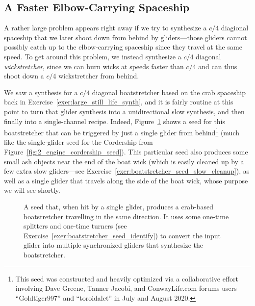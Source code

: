 \subsection{A Faster Elbow-Carrying Spaceship}\label{sec:fast_demonoid_elbow_carry}

A rather large problem appears right away if we try to synthesize a $c/4$ diagional spaceship that we later shoot down from behind by gliders---those gliders cannot possibly catch up to the elbow-carrying spaceship since they travel at the same speed. To get around this problem, we instead synthesize a $c/4$ diagonal \emph{wickstretcher}, since we can burn wicks at speeds faster than $c/4$ and can thus shoot down a $c/4$ wickstretcher from behind.

We saw a synthesis for a $c/4$ diagonal boatstretcher based on the crab spaceship back in Exercise~\ref{exer:large_still_life_synth}, and it is fairly routine at this point to turn that glider synthesis into a unidirectional slow synthesis, and then finally into a single-channel recipe. Indeed, Figure~\ref{fig:boatstretcher_seed} shows a seed for this boatstretcher that can be triggered by just a single glider from behind\footnote{This seed was constructed and heavily optimized via a collaborative effort involving Dave Greene, Tanner Jacobi, and ConwayLife.com forums users ``Goldtiger997'' and ``toroidalet'' in July and August 2020.} (much like the single-glider seed for the Cordership from Figure~\ref{fig:2_engine_cordership_seed}). This particular seed also produces some small ash objects near the end of the boat wick (which is easily cleaned up by a few extra slow gliders---see Exercise~\ref{exer:boatstretcher_seed_slow_cleanup}), as well as a single glider that travels along the side of the boat wick, whose purpose we will see shortly.

\begin{figure}[!htb]
	\centering
	
	\caption{A seed that, when hit by a single glider, produces a crab-based boatstretcher travelling in the same direction. It uses some one-time splitters and one-time turners (see Exercise~\ref{exer:boatstretcher_seed_identify}) to convert the input glider into multiple synchronized gliders that synthesize the boatstretcher.}\label{fig:boatstretcher_seed}
\end{figure}

